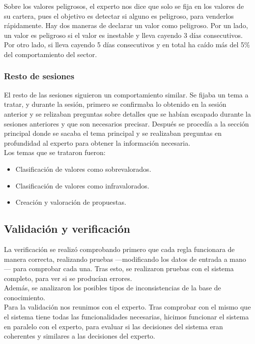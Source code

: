 Sobre los valores peligrosos, el experto nos dice que solo se fija en los valores de su cartera, pues el objetivo es detectar si alguno es peligroso, para venderlos rápidamente. Hay dos maneras de declarar un valor como peligroso. Por un lado, un valor es peligroso si el valor es inestable y lleva cayendo 3 días consecutivos. Por otro lado, si lleva cayendo 5 días consecutivos y en total ha caído más del 5\% del comportamiento del sector.

\subsubsection{Resto de sesiones}

El resto de las sesiones siguieron un comportamiento similar. Se fijaba un tema a tratar, y durante la sesión, primero se confirmaba lo obtenido en la sesión anterior y se relizaban preguntas sobre detalles que se habían escapado durante la sesiones anteriores y que son necesarios precisar. Después se procedía a la sección principal donde se sacaba el tema principal y se realizaban preguntas en profundidad al experto para obtener la información necesaria.\\

Los temas que se trataron fueron:\
\begin{itemize}
\item Clasificación de valores como sobrevalorados.
\item Clasificación de valores como infravalorados.
\item Creación y valoración de propuestas.
\end{itemize}

\subsection{Validación y verificación}

La verificación se realizó comprobando primero que cada regla funcionara de manera correcta, realizando pruebas ---modificando los datos de entrada a mano--- para comprobar cada una. Tras esto, se realizaron pruebas con el sistema completo, para ver si se producían errores.\\

Además, se analizaron los posibles tipos de inconsistencias de la base de conocimiento.\\

Para la validación nos reunimos con el experto. Tras comprobar con el mismo que el sistema tiene todas las funcionalidades necesarias, hicimos funcionar el sistema en paralelo con el experto, para evaluar si las decisiones del sistema eran coherentes y similares a las decisiones del experto.\\

